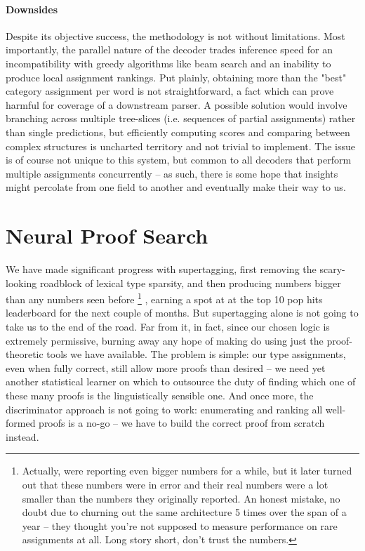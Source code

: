 \paragraph{Downsides}
Despite its objective success, the methodology is not without limitations.
Most importantly, the parallel nature of the decoder trades inference speed for an incompatibility with greedy algorithms like beam search and an inability to produce local assignment rankings.
Put plainly, obtaining more than the "best" category assignment per word is not straightforward, a fact which can prove harmful for coverage of a downstream parser.
A possible solution would involve branching across multiple tree-slices (i.e. sequences of partial assignments) rather than single predictions, but efficiently computing scores and comparing between complex structures is uncharted territory and not trivial to implement.
The issue is of course not unique to this system, but common to all decoders that perform multiple assignments concurrently -- as such, there is some hope that insights might percolate from one field to another and eventually make their way to us.

\section{Neural Proof Search}
\label{section:npn}
We have made significant progress with supertagging, first removing the scary-looking roadblock of lexical type sparsity, and then producing numbers bigger than any numbers seen before%
	\footnote{Actually, \citet{tian2020supertagging} were reporting even bigger numbers for a while, but it later turned out that these numbers were in error and their real numbers were a lot smaller than the numbers they originally reported.
	An honest mistake, no doubt due to churning out the same architecture 5 times over the span of a year -- they thought you're not supposed to measure performance on rare assignments at all.
	Long story short, don't trust the numbers.}%
, earning a spot at at the top 10 pop hits leaderboard for the next couple of months.
But supertagging alone is not going to take us to the end of the road.
Far from it, in fact, since our chosen logic is extremely permissive, burning away any hope of making do using just the proof-theoretic tools we have available.
The problem is simple: our type assignments, even when fully correct, still allow more proofs than desired -- we need yet another statistical learner on which to outsource the duty of finding which one of these many proofs is the linguistically sensible one.
And once more, the discriminator approach is not going to work: enumerating and ranking all well-formed proofs is a no-go -- we have to build the correct proof from scratch instead.

